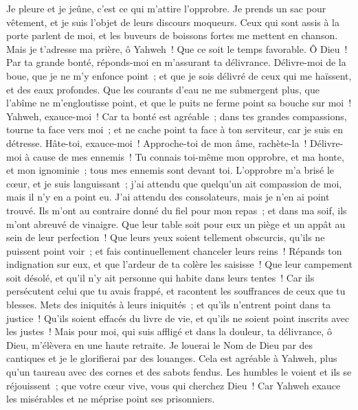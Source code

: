 \begin{multicols}{2}
Je pleure et je jeûne, c'est ce qui m'attire l'opprobre.
Je prends un sac pour vêtement, et je suis l'objet de leurs discours moqueurs.
Ceux qui sont assis à la porte parlent de moi, et les buveurs de boissons fortes me mettent en chanson.
Mais je t'adresse ma prière, ô Yahweh~! Que ce soit le temps favorable. Ô Dieu~! Par ta grande bonté, réponds-moi en m'assurant ta délivrance.
Délivre-moi de la boue, que je ne m'y enfonce point~; et que je sois délivré de ceux qui me haïssent, et des eaux profondes.
Que les courants d'eau ne me submergent plus, que l'abîme ne m'engloutisse point, et que le puits ne ferme point sa bouche sur moi~!
Yahweh, exauce-moi~! Car ta bonté est agréable~; dans tes grandes compassions, tourne ta face vers moi~;
et ne cache point ta face à ton serviteur, car je suis en détresse. Hâte-toi, exauce-moi~!
Approche-toi de mon âme, rachète-la~! Délivre-moi à cause de mes ennemis~!
Tu connais toi-même mon opprobre, et ma honte, et mon ignominie~; tous mes ennemis sont devant toi.
L'opprobre m'a brisé le cœur, et je suis languissant~; j'ai attendu que quelqu'un ait compassion de moi, mais il n'y en a point eu. J'ai attendu des consolateurs, mais je n'en ai point trouvé.
Ils m'ont au contraire donné du fiel pour mon repas~; et dans ma soif, ils m'ont abreuvé de vinaigre.
Que leur table soit pour eux un piège et un appât au sein de leur perfection~!
Que leurs yeux soient tellement obscurcis, qu'ils ne puissent point voir~; et fais continuellement chanceler leurs reins~!
Répands ton indignation sur eux, et que l'ardeur de ta colère les saisisse~!
Que leur campement soit désolé, et qu'il n'y ait personne qui habite dans leurs tentes~!
Car ils persécutent celui que tu avais frappé, et racontent les souffrances de ceux que tu blesses.
Mets des iniquités à leurs iniquités~; et qu'ils n'entrent point dans ta justice~!
Qu'ils soient effacés du livre de vie, et qu'ils ne soient point inscrits avec les justes~!
Mais pour moi, qui suis affligé et dans la douleur, ta délivrance, ô Dieu, m'élèvera en une haute retraite.
Je louerai le Nom de Dieu par des cantiques et je le glorifierai par des louanges.
Cela est agréable à Yahweh, plus qu'un taureau avec des cornes et des sabots fendus.
Les humbles le voient et ils se réjouissent~; que votre cœur vive, vous qui cherchez Dieu~!
Car Yahweh exauce les misérables et ne méprise point ses prisonniers.

\end{multicols}
